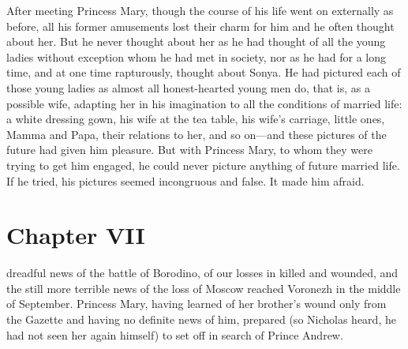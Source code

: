 After meeting Princess Mary, though the course of his life went
on externally as before, all his former amusements lost their
charm for him and he often thought about her. But he never
thought about her as he had thought of all the young ladies
without exception whom he had met in society, nor as he had for a
long time, and at one time rapturously, thought about Sonya. He
had pictured each of those young ladies as almost all
honest-hearted young men do, that is, as a possible wife,
adapting her in his imagination to all the conditions of married
life: a white dressing gown, his wife at the tea table, his
wife's carriage, little ones, Mamma and Papa, their relations to
her, and so on---and these pictures of the future had given him
pleasure. But with Princess Mary, to whom they were trying to get
him engaged, he could never picture anything of future married
life. If he tried, his pictures seemed incongruous and false. It
made him afraid.


\chapter*{Chapter VII} \ifaudio {}
\fi

 dreadful news of the battle of Borodino, of our losses in
killed and wounded, and the still more terrible news of the loss
of Moscow reached Voronezh in the middle of September. Princess
Mary, having learned of her brother's wound only from the Gazette
and having no definite news of him, prepared (so Nicholas heard,
he had not seen her again himself) to set off in search of Prince
Andrew.

